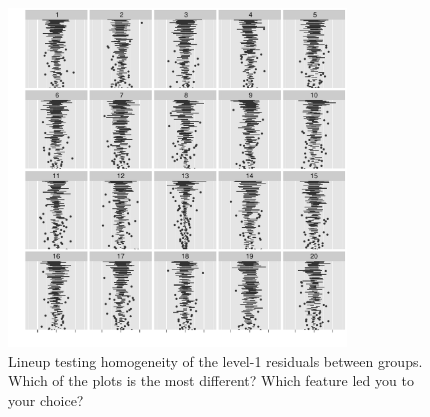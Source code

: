 \documentclass[12pt]{article} %
\newcommand{\al}[1]{{\color{ForestGreen} #1}}
\newcommand{\alnote}[1]{\todo[inline,color=green!40]{#1}} %
\newcommand{\hhnote}[1]{\todo[inline,color=orange!40]{#1}}
\begin{document}

%
%
%

\begin{figure}[hbt]
	\centering
	\includegraphics[width=0.8\textwidth]{cyclone-13.pdf}
	\caption{\label{fig:badcyclone} 
	Lineup testing homogeneity of the level-1 residuals between groups. Which of the plots is the most different? Which feature led you to your choice?}
\end{figure}
\end{document}
